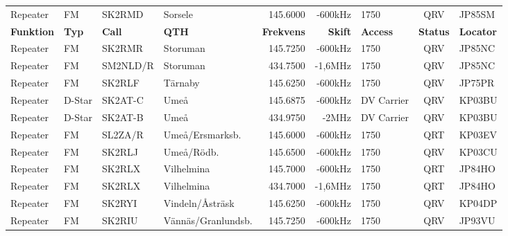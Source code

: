 \documentclass[10pt,swedish,a4paper,twoside]{article}
\begin{document}
\begin{landscape}
\begin{longtable}{llllrrlcl}
	Repeater          & FM           & SK2RMD        & Sorsele            &          145.6000 &        -600kHz & 1750             &       QRV       & JP85SM           \\
		\textbf{Funktion} & \textbf{Typ} & \textbf{Call} & \textbf{QTH}       & \textbf{Frekvens} & \textbf{Skift} & \textbf{Access}  & \textbf{Status} & \textbf{Locator} \\ \hline
	Repeater          & FM           & SK2RMR        & Storuman           &          145.7250 &        -600kHz & 1750             &       QRV       & JP85NC           \\
	Repeater          & FM           & SM2NLD/R      & Storuman           &          434.7500 &        -1,6MHz & 1750             &       QRV       & JP85NC           \\
	Repeater          & FM           & SK2RLF        & Tärnaby            &          145.6250 &        -600kHz & 1750             &       QRV       & JP75PR           \\
	Repeater          & D-Star       & SK2AT-C       & Umeå               &          145.6875 &        -600kHz & DV Carrier       &       QRV       & KP03BU           \\
	Repeater          & D-Star       & SK2AT-B       & Umeå               &          434.9750 &          -2MHz & DV Carrier       &       QRV       & KP03BU           \\
	Repeater          & FM           & SL2ZA/R       & Umeå/Ersmarksb.    &          145.6000 &        -600kHz & 1750             &       QRT       & KP03EV           \\
	Repeater          & FM           & SK2RLJ        & Umeå/Rödb.         &          145.6500 &        -600kHz & 1750             &       QRV       & KP03CU           \\
	Repeater          & FM           & SK2RLX        & Vilhelmina         &          145.7000 &        -600kHz & 1750             &       QRT       & JP84HO           \\
	Repeater          & FM           & SK2RLX        & Vilhelmina         &          434.7000 &        -1,6MHz & 1750             &       QRT       & JP84HO           \\
	Repeater          & FM           & SK2RYI        & Vindeln/Åsträsk    &          145.6250 &        -600kHz & 1750             &       QRV       & KP04DP           \\
	Repeater          & FM           & SK2RIU        & Vännäs/Granlundsb. &          145.7250 &        -600kHz & 1750             &       QRV       & JP93VU           \\

\end{longtable}
\end{landscape}
\end{document}
